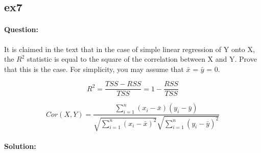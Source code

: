 \documentclass[a4paper,12pt,titlepage]{article} %
\begin{document}
\subsection{ex7}
\paragraph{Question:} It is claimed in the text that in the case of simple linear regression of Y onto X, the $R^{2}$ statistic is equal to the square of the correlation between X and Y. Prove that this is the case. For simplicity, you may assume that $\bar{x}$ = $\bar{y}$ = 0.

$$ R^{2} = \frac{TSS - RSS}{TSS} = 1 - \frac{RSS}{TSS} $$

$$ Cor(X,Y) = \frac{\sum_{i=1}^{n} (x_{i}-\bar{x}) (y_{i}-\bar{y})} {\sqrt{\sum_{i=1}^{n} (x_{i}-\bar{x})^{2}} \sqrt{\sum_{i=1}^{n} (y_{i}-\bar{y})^{2}}}$$

\paragraph{Solution:}








\newpage
\listoftables

\newpage
\listoffigures

\end{document}

